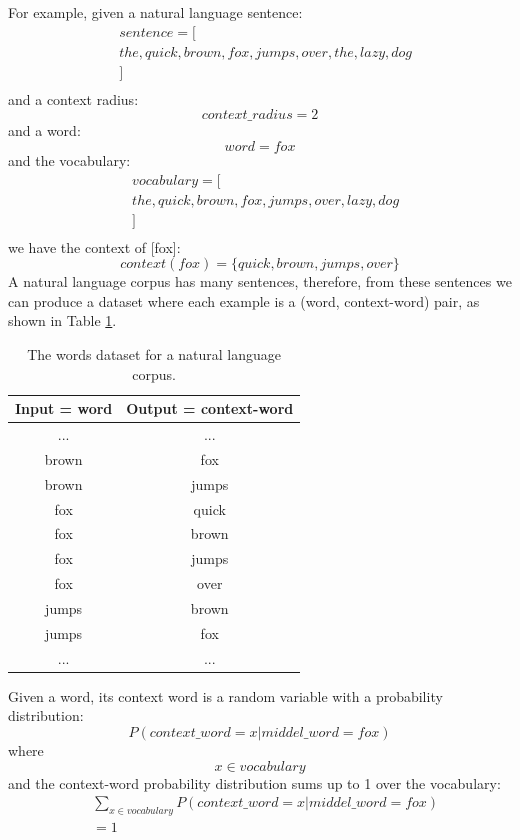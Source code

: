 \documentclass[conference]{IEEEtran}
\begin{document}
For example, given a natural language sentence:
\begin{align*}
	&sentence = [\\
	&the, quick, brown, fox, jumps, over, the, lazy, dog\\
	&]\\
\end{align*}
and a context radius:
\[context\_radius = 2\]
and a word:
\[word = fox\]
and the vocabulary:
\begin{align*}
	&vocabulary = [\\
	&the, quick, brown, fox, jumps, over, lazy, dog\\
	&]\\
\end{align*}
we have the context of [fox]:
\[ context(fox) = \{quick, brown, jumps, over\} \]
A natural language corpus has many sentences,
therefore, from these sentences we can produce a dataset where each example is a (word, context-word) pair,
as shown in Table \ref{tab:words}.
\begin{table}[!ht]
	\centering
	\caption{The words dataset for a natural language corpus.}
	\begin{tabular}{cc} \hline \rowcolor{blue!30}
		Input = word & Output = context-word \\ \hline
		... & ...       \\ \hline
		brown & fox \\ \hline
		brown & jumps \\ \hline
		fox & quick \\ \hline
		fox & brown \\ \hline
		fox & jumps \\ \hline
		fox & over \\ \hline
		jumps & brown \\ \hline
		jumps & fox \\ \hline
		... & ...       \\ \hline
	\end{tabular}
	\label{tab:words}
\end{table}
Given a word, its context word is a random variable with a probability distribution:
\[P(context\_word = x | middel\_word = fox)\]
where
\[x \in vocabulary\]
and the context-word probability distribution sums up to 1 over the vocabulary:
\begin{align*}
	&\sum_{x \in vocabulary}P(context\_word = x | middel\_word = fox)\\
	&= 1\\
\end{align*}
\end{document}
